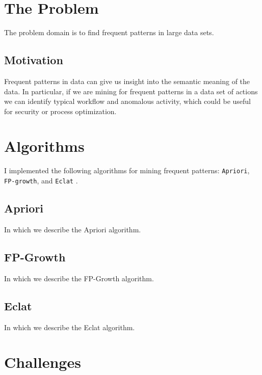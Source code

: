 \documentclass[11pt]{article}
\begin{document}
\begin{multicols}{2} %


\section{The Problem}

The problem domain is to find frequent patterns in large data sets.

\subsection{Motivation}

Frequent patterns in data can give us insight into the semantic
meaning of the data.  In particular, if we are mining for frequent
patterns in a data set of actions we can identify typical workflow and
anomalous activity, which could be useful for security or process
optimization.

\section{Algorithms}

I implemented the following algorithms for mining frequent patterns:
\texttt{Apriori}, \texttt{FP-growth}, and \texttt{Eclat}
\cite{Han2007,fpmlecture}.

\subsection{Apriori}

In which we describe the Apriori algorithm.

\subsection{FP-Growth}

In which we describe the FP-Growth algorithm.

\subsection{Eclat}

In which we describe the Eclat algorithm.

\section{Challenges}


\end{multicols}
\end{document}
